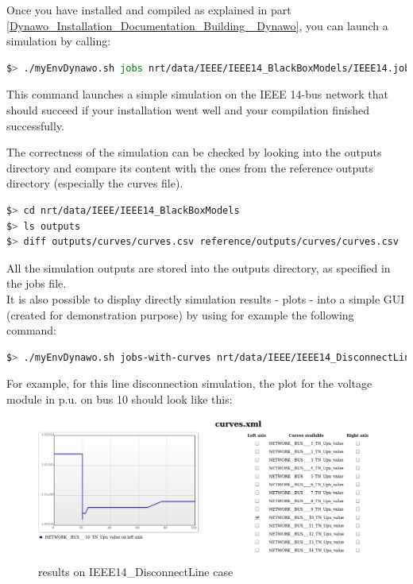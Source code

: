 \documentclass[a4paper, 12pt]{report}
\begin{document}
Once you have installed and compiled \Dynawo as explained in part \ref{Dynawo_Installation_Documentation_Building _Dynawo}, you can launch a simulation by calling:

\begin{lstlisting}[language=bash]
$> ./myEnvDynawo.sh jobs nrt/data/IEEE/IEEE14_BlackBoxModels/IEEE14.jobs
\end{lstlisting}

This command launches a simple simulation on the IEEE 14-bus network that should succeed if your installation went well and your compilation finished successfully. 

The correctness of the simulation can be checked by looking into the outputs directory and compare its content with the ones from the reference outputs directory (especially the curves file).

\begin{lstlisting}[language=bash]
$> cd nrt/data/IEEE/IEEE14_BlackBoxModels
$> ls outputs
$> diff outputs/curves/curves.csv reference/outputs/curves/curves.csv
\end{lstlisting}

All the simulation outputs are stored into the outputs directory, as specified in the jobs file. \\

It is also possible to display directly simulation results - plots - into a simple GUI (created for demonstration purpose) by using for example the following command:

\begin{lstlisting}[language=bash]
$> ./myEnvDynawo.sh jobs-with-curves nrt/data/IEEE/IEEE14_DisconnectLine/IEEE14.jobs
\end{lstlisting}

For example, for this line disconnection simulation, the plot for the voltage module in p.u. on bus 10 should look like this:

\begin{figure}[h!]
\centering
\includegraphics[width=\textwidth]{../resources/VoltageModule.png}
\caption{\Dynawo results on IEEE14\_DisconnectLine case}
\end{figure}
\end{document}
